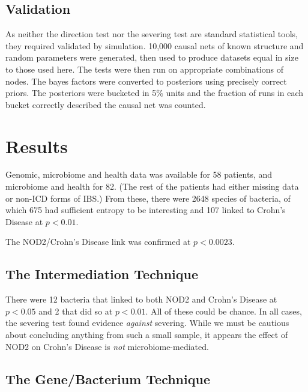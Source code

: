 \documentclass[a4paper]{article}
\begin{document}
\subsection{Validation}

As neither the direction test nor the severing test are standard
statistical tools, they required validated by simulation.  
10,000 causal nets of known structure and random parameters were
generated, then used to produce
datasets equal in size to those used here. The tests were then run on
appropriate combinations of nodes.  The bayes factors were converted to
posteriors using precisely correct priors.  The posteriors were bucketed in 5\%
units and the fraction of runs in each bucket correctly
described the causal net was counted.

\section{Results}

Genomic, microbiome and health data was available for 58 patients, and
microbiome and health for 82.  (The rest of the patients had either
missing data or non-ICD forms of IBS.)  From
these, there were 2648 species of bacteria, of which 675 had sufficient
entropy to be interesting and 107 linked to Crohn's Disease at
$p<0.01$.

The NOD2/Crohn's Disease link was confirmed at $p<0.0023$.

\subsection{The Intermediation Technique}

There were 12 bacteria that linked to both NOD2 and Crohn's Disease at
$p<0.05$ and 2 that did so at $p<0.01$.  All of these could be
chance. In all cases, the severing
test found evidence \textit{against} severing.  While we must be
cautious about concluding anything from such a small sample, it
appears the effect of NOD2 on Crohn's Disease is \textit{not}
microbiome-mediated.

\subsection{The Gene/Bacterium Technique}
\end{document}
